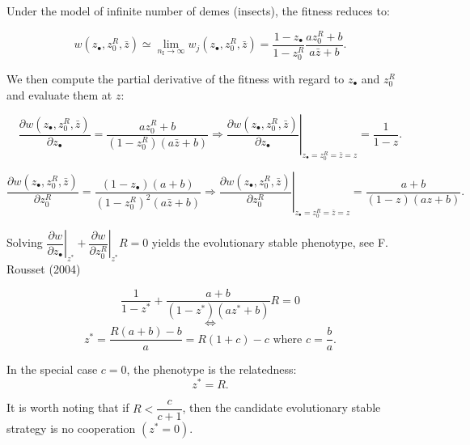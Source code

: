 \documentclass{article}
\newcommand{\nI}{{n_\textrm{I}}}
\begin{document}
  Under the model of infinite number of demes (insects), the fitness reduces to:
  
  \begin{equation}
  w(z_\bullet ,z_0^R , \bar{z} ) \simeq \lim_{\nI \rightarrow \infty} w_j(z_\bullet ,z_0^R , \bar{z} ) = \dfrac{1-z_\bullet}{1- z_0^R}\dfrac{a z_0^R +b }{a \bar{z} +b}.
  \end{equation}
  
  We then compute the partial derivative of the fitness with regard to $z_\bullet$ and $z_0^R$ and evaluate them at $z$:
  
  \begin{equation}
  \dfrac{\partial w(z_\bullet ,z_0^R , \bar{z} )}{\partial z_\bullet} = \dfrac{a z_0^R +b }{ (1 - z_0^R) (a \bar{z} +b) } \Rightarrow \left. \dfrac{\partial w(z_\bullet ,z_0^R , \bar{z} )}{\partial z_\bullet} \right\vert_{z_\bullet = z_0^R = \bar{z}=z} = \dfrac{1}{ 1 - z }.
  \end{equation}
  
  \begin{equation}
  \dfrac{\partial w(z_\bullet ,z_0^R , \bar{z} )}{\partial z_0^R} = \dfrac{(1- z_\bullet)(a +b)}{(1- z_0^R)^2(a \bar{z} +b)} \Rightarrow \left. \dfrac{\partial w(z_\bullet ,z_0^R , \bar{z} )}{\partial z_0^R} \right\vert_{z_\bullet = z_0^R = \bar{z}=z} = \dfrac{a +b}{(1- z)(a z +b)}.
  \end{equation}
  
  Solving $\left. \dfrac{\partial w}{\partial z_\bullet} \right\vert_{z^*} + \left. \dfrac{\partial w}{\partial z_0^R} \right\vert_{z^*} R =0 $ yields the evolutionary stable phenotype, see F. Rousset (2004) 
  
    \begin{equation}
  \dfrac{1}{ 1 - z^* } + \dfrac{a +b}{(1- z^*)(a z^* +b)}R =0
  \end{equation}
  \begin{equation}
  \iff
  \end{equation}
  \begin{equation}
  z^*=\dfrac{R(a+b)-b}{a}=R(1+c)-c \text{ where }c=\dfrac{b}{a}.
  \end{equation}
  
  
  In the special case $c=0$, the phenotype is the relatedness:
  \begin{equation}
  z^*=R.
  \end{equation}
  
  
  It is worth noting that if $R<\dfrac{c}{c+1}$, then the candidate evolutionary stable strategy is no cooperation $(z^*=0)$.
\end{document}
